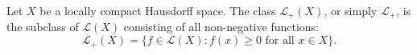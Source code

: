 Let $X$ be a locally compact Hausdorff space. The class $\mathcal{L}_+(X)$, or simply $\mathcal{L}_+$, is the subclass of $\mathcal{L}(X)$ consisting of all non-negative functions:
$$\mathcal{L}_+(X) = \{f \in \mathcal{L}(X) : f(x) \geq 0 \text{ for all } x \in X\}.$$

